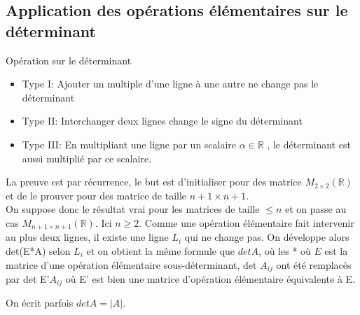
\subsection{Application des opérations élémentaires sur le déterminant}
\begin{parag}{Opération sur le déterminant}
    
\begin{itemize}
    \item Type I: Ajouter un multiple d'une ligne à une autre ne change pas le déterminant
    \item Type II: Interchanger deux lignes change le signe du déterminant
    \item Type III: En multipliant une ligne par un scalaire $\alpha \in \mathbb{R}$ , le déterminant est aussi multiplié par ce scalaire.

     
\end{itemize}

La preuve est par récurrence, le but est d'initialiser pour des matrice $M_{2\times 2}(\mathbb{R})$ et de le prouver pour des matrice de taille $n+1\times n+1$. 
\\
On suppose donc le résultat vrai pour les matrices de taille $\leq n$ et on passe au cas $M_{n+1\times n+1}(\mathbb{R})$. Ici $n \geq 2$. Comme une opération élémentaire fait intervenir au plus deux lignes, il existe une ligne $L_i$ qui ne change pas. On développe alors det(E*A) selon $L_i$ et on obtient la même formule que $det A$, où les * où $E$ est la matrice d'une opération élémentaire sous-déterminant, det $A_{ij}$ ont été remplacés par det E'$A_{ij}$ où E' est bien une matrice d'opération élémentaire équivalente à E.
\begin{framedremark}
    On écrit parfois $det A = |A|$.
\end{framedremark}
    


\end{parag}
